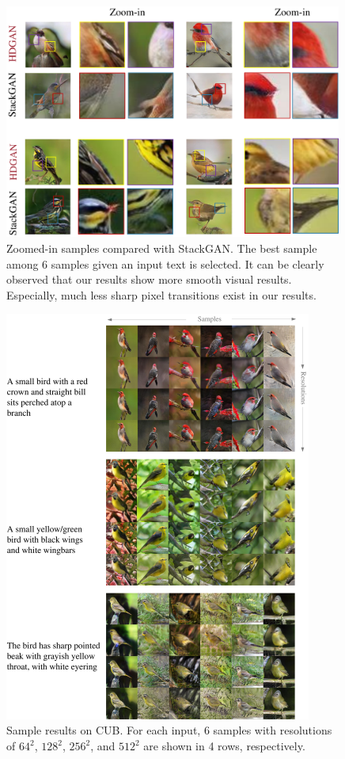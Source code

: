\documentclass[10pt, letterpaper]{article}
\begin{document}
\begin{figure}[th!]
	\centering
	\includegraphics[width=0.99\textwidth]{figure/supp_bird3.pdf}
	
	\caption{Zoomed-in samples compared with StackGAN. The best sample among 6 samples given an input text is selected. It can be clearly observed that our results show more smooth visual results. Especially, much less sharp pixel transitions exist in our results. }  
	\label{fig:bird3}
\end{figure}
\newpage
\begin{figure}[th!]
    \centering
    \includegraphics[width=0.9\textwidth]{figure/supp_bird.pdf}

    \caption{Sample results on CUB. For each input, 6 samples with resolutions of $64^2$, $128^2$, $256^2$, and $512^2$ are shown in 4 rows, respectively. }  
    \label{fig:bird}
\end{figure}
\end{document}
